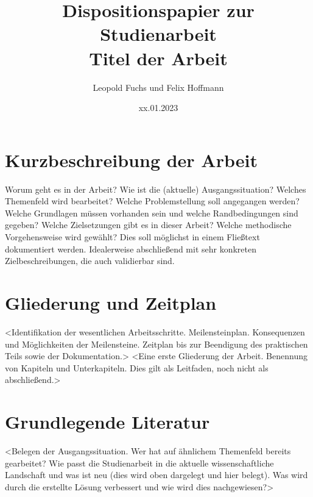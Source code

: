 \documentclass{scrartcl}
\title{Dispositionspapier zur Studienarbeit\\Titel der Arbeit}
\author{ Leopold Fuchs und Felix Hoffmann }
\date{xx.01.2023}
\begin{document}
\maketitle

\section{Kurzbeschreibung der Arbeit}
Worum geht es in der Arbeit? Wie ist die (aktuelle) Ausgangssituation? Welches
Themenfeld wird bearbeitet? Welche Problemstellung soll angegangen werden? Welche
Grundlagen müssen vorhanden sein und welche Randbedingungen sind gegeben? Welche
Zielsetzungen gibt es in dieser Arbeit? Welche methodische Vorgehensweise wird
gewählt?  Dies soll möglichst in einem Fließtext dokumentiert werden. Idealerweise
abschließend mit sehr konkreten Zielbeschreibungen, die auch validierbar sind.

\section{Gliederung und Zeitplan}
<Identifikation der wesentlichen Arbeitsschritte. Meilensteinplan. Konsequenzen
und Möglichkeiten der Meilensteine. Zeitplan bis zur Beendigung des praktischen
Teils sowie der Dokumentation.> <Eine erste Gliederung der Arbeit. Benennung von
Kapiteln und Unterkapiteln. Dies gilt als Leitfaden, noch nicht als abschließend.>

\section{Grundlegende Literatur}
<Belegen der Ausgangssituation. Wer hat auf ähnlichem Themenfeld bereits
gearbeitet? Wie passt die Studienarbeit in die aktuelle wissenschaftliche
Landschaft und was ist neu (dies wird oben dargelegt und hier belegt). Was wird
durch die erstellte Lösung verbessert und wie wird dies nachgewiesen?>
\end{document}
